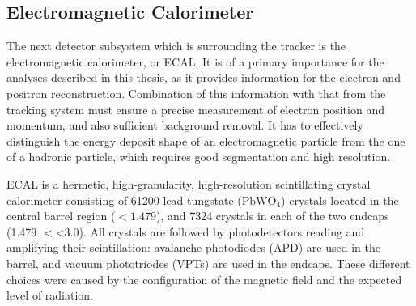 
\subsection{Electromagnetic Calorimeter}
The next detector subsystem which is surrounding the tracker is the electromagnetic calorimeter, or ECAL. It is of a
primary importance for the analyses described in this thesis, as it provides information for the electron and positron
reconstruction. Combination of this information with that from the tracking system must ensure a precise measurement of
electron position and momentum, and also sufficient background removal. It has to effectively distinguish the energy
deposit shape of an electromagnetic particle from the one of a hadronic particle, which requires good segmentation and
high resolution.

ECAL is a hermetic, high-granularity, high-resolution scintillating crystal calorimeter consisting of \num{61200} lead
tungstate ($\textrm{PbWO}_4$) crystals located in the central barrel region (\abs\eta $<1.479$), and \num{7324} crystals
in each of the two endcaps (\num{1.479} $<$\abs\eta\num{<3.0}). All crystals are followed by photodetectors reading and
amplifying their scintillation: avalanche photodiodes (APD) are used in the barrel, and vacuum phototriodes (VPTs) are
used in the endcaps. These different choices were caused by the configuration of the magnetic field and the expected
level of radiation.

